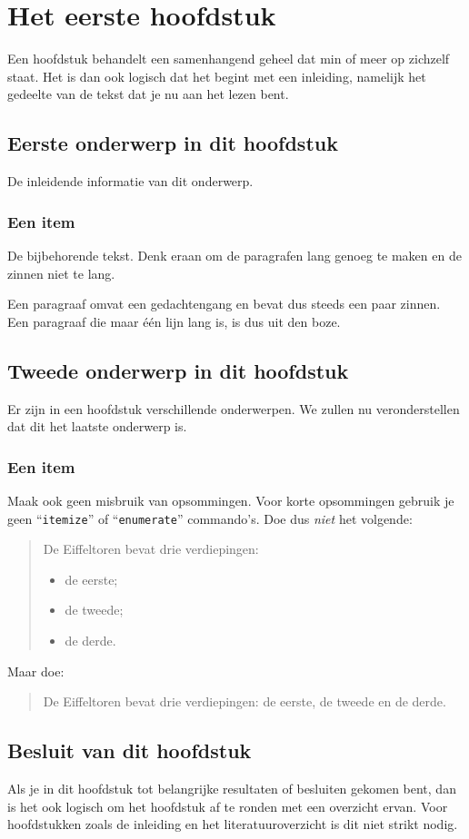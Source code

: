 \chapter{Het eerste hoofdstuk}
\label{hoofdstuk:1}
Een hoofdstuk behandelt een samenhangend geheel dat min of meer op zichzelf
staat. Het is dan ook logisch dat het begint met een inleiding, namelijk
het gedeelte van de tekst dat je nu aan het lezen bent.

\section{Eerste onderwerp in dit hoofdstuk}
De inleidende informatie van dit onderwerp.

\subsection{Een item}
De bijbehorende tekst. Denk eraan om de paragrafen lang genoeg te maken en
de zinnen niet te lang.

Een paragraaf omvat een gedachtengang en bevat dus steeds een paar zinnen.
Een paragraaf die maar \'e\'en lijn lang is, is dus uit den boze.

\section{Tweede onderwerp in dit hoofdstuk}
Er zijn in een hoofdstuk verschillende onderwerpen. We zullen nu
veronderstellen dat dit het laatste onderwerp is.

\subsection{Een item}
Maak ook geen misbruik van opsommingen. Voor korte opsommingen gebruik je
geen ``\verb|itemize|'' of ``\texttt{enumerate}'' commando's. Doe dus
\emph{niet} het volgende:
\begin{quote}
  De Eiffeltoren bevat drie verdiepingen:
  \begin{itemize}
  \item de eerste;
  \item de tweede;
  \item de derde.
  \end{itemize}
\end{quote}
Maar doe:
\begin{quote}
  De Eiffeltoren bevat drie verdiepingen: de eerste, de tweede en de derde.
\end{quote}

\section{Besluit van dit hoofdstuk}
Als je in dit hoofdstuk tot belangrijke resultaten of besluiten gekomen
bent, dan is het ook logisch om het hoofdstuk af te ronden met een
overzicht ervan. Voor hoofdstukken zoals de inleiding en het
literatuuroverzicht is dit niet strikt nodig.

